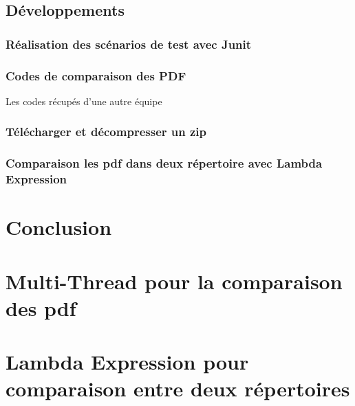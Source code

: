 \documentclass[12pt]{article}
\begin{document}
\subsection{Développements}
    \subsubsection{Réalisation des scénarios de test avec Junit}
    
    \subsubsection{Codes de comparaison des PDF}
    Les codes récupés d'une autre équipe
    \subsubsection{Télécharger et décompresser un zip}
    
    \subsubsection{Comparaison les pdf dans deux répertoire avec Lambda Expression}

\newpage
\section{Conclusion}

\newpage



\newpage
\begin{appendix}

\section{Multi-Thread pour la comparaison des pdf}

\section{Lambda Expression pour comparaison entre deux répertoires}
\end{appendix}
\newpage

\end{document}

